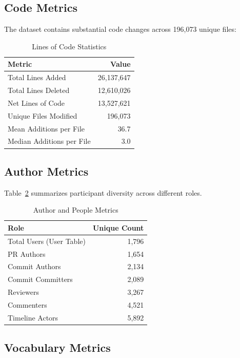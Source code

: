 \documentclass[11pt]{article}
\begin{document}
\subsection{Code Metrics}

The dataset contains substantial code changes across 196,073 unique files:

\begin{table}[H]
\centering
\caption{Lines of Code Statistics}
\label{tab:loc_stats}
\begin{tabular}{@{}lr@{}}
\toprule
\textbf{Metric} & \textbf{Value} \\
\midrule
Total Lines Added & 26,137,647 \\
Total Lines Deleted & 12,610,026 \\
Net Lines of Code & 13,527,621 \\
Unique Files Modified & 196,073 \\
Mean Additions per File & 36.7 \\
Median Additions per File & 3.0 \\
\bottomrule
\end{tabular}
\end{table}

\subsection{Author Metrics}

Table~\ref{tab:author_metrics} summarizes participant diversity across different roles.

\begin{table}[H]
\centering
\caption{Author and People Metrics}
\label{tab:author_metrics}
\begin{tabular}{@{}lr@{}}
\toprule
\textbf{Role} & \textbf{Unique Count} \\
\midrule
Total Users (User Table) & 1,796 \\
PR Authors & 1,654 \\
Commit Authors & 2,134 \\
Commit Committers & 2,089 \\
Reviewers & 3,267 \\
Commenters & 4,521 \\
Timeline Actors & 5,892 \\
\bottomrule
\end{tabular}
\end{table}

\subsection{Vocabulary Metrics}
\end{document}
